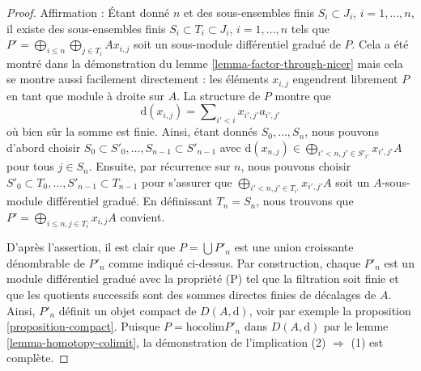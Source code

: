 \begin{proof}
\medskip\noindent
Affirmation : Étant donné $n$ et des sous-ensembles finis $S_i \subset J_i$, $i = 1,
\ldots, n$, il existe des sous-ensembles finis $S_i \subset T_i \subset J_i$, $i = 1,
\ldots, n$ tels que $P' = \bigoplus_{i \leq n} \bigoplus_{j \in T_i} Ax_{i, j}$ soit un
sous-module différentiel gradué de $P$. Cela a été montré dans la
démonstration du lemme \ref{lemma-factor-through-nicer} mais cela se montre aussi
facilement directement : les éléments $x_{i, j}$ engendrent librement $P$ en
tant que module à droite sur $A$. La structure de $P$ montre que
$$
\text{d}(x_{i, j}) = \sum\nolimits_{i' < i} x_{i', j'}a_{i', j'}
$$
où bien sûr la somme est finie.
Ainsi, étant donnés $S_0, \ldots, S_n$, nous pouvons d'abord
choisir $S_0 \subset S'_0, \ldots, S_{n - 1} \subset S'_{n - 1}$
avec $\text{d}(x_{n, j}) \in \bigoplus_{i' < n, j' \in S'_{i'}} x_{i', j'}A$ pour
tous $j \in S_n$. Ensuite, par récurrence sur $n$, nous pouvons
choisir $S'_0 \subset T_0, \ldots, S'_{n - 1} \subset T_{n - 1}$
pour s'assurer que $\bigoplus_{i' < n, j' \in T_{i'}} x_{i', j'}A$ soit
un $A$-sous-module différentiel gradué. En définissant $T_n = S_n$, nous trouvons
que $P' = \bigoplus_{i \leq n, j \in T_i} x_{i, j}A$ convient.

\medskip\noindent
D'après l'assertion, il est clair que $P = \bigcup P'_n$
est une union croissante dénombrable de $P'_n$ comme
indiqué ci-dessus. Par construction, chaque $P'_n$ est un module différentiel
gradué avec la propriété (P) tel que la filtration soit finie et que les
quotients successifs sont des sommes directes finies de décalages de $A$.
Ainsi, $P'_n$ définit un objet compact de $D(A, \text{d})$, voir par
exemple la proposition \ref{proposition-compact}.
Puisque $P = \text{hocolim} P'_n$ dans $D(A, \text{d})$ par
le lemme \ref{lemma-homotopy-colimit}, la
démonstration de l'implication (2) $\Rightarrow$ (1) est complète.
\end{proof}










